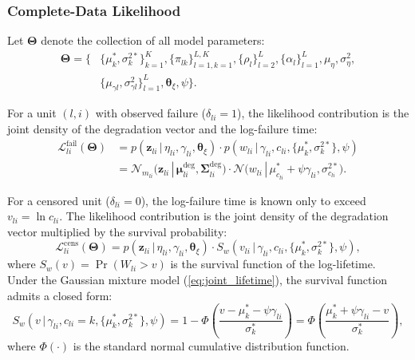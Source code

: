 \documentclass[a4paper,fleqn,longmktitle]{cas-sc}
\newcommand{\given}{\,|\,}
\newcommand{\normal}{\mathcal{N}}
\begin{document}
\subsubsection{Complete-Data Likelihood}

Let $\bm{\Theta}$ denote the collection of all model parameters:
\begin{equation}\label{eq:Theta}
    \begin{aligned}
        \bm{\Theta} = \bigl\{
            &\{\mu_k^*, \sigma_k^{2*}\}_{k=1}^{K},
            \{\pi_{lk}\}_{l=1,k=1}^{L,K},
            \{\rho_l\}_{l=2}^{L}, \{\alpha_l\}_{l=1}^{L},
            \mu_\eta, \sigma_\eta^2, \\
            &\{\mu_{\gamma l}, \sigma_{\gamma l}^2\}_{l=1}^{L},
            \bm{\theta}_\xi, \psi \bigr\}.
    \end{aligned}
\end{equation}

For a unit $(l,i)$ with observed failure ($\delta_{li} = 1$), the likelihood contribution is the joint density of the degradation vector and the log-failure time:
\begin{equation}\label{eq:lik_fail}
    \begin{aligned}
        \mathcal{L}_{li}^{\text{fail}}(\bm{\Theta})
        &= p(\bm{z}_{li} \given \eta_{li}, \gamma_{li}, \bm{\theta}_\xi)
           \cdot p(w_{li} \given \gamma_{li}, c_{li}, \{\mu_k^*, \sigma_k^{2*}\}, \psi) \\[2pt]
        &= \normal_{m_{li}}\!\bigl(\bm{z}_{li} \given \bm{\mu}_{li}^{\text{deg}}, \bm{\Sigma}_{li}^{\text{deg}}\bigr)
           \cdot \normal\!\bigl(w_{li} \given \mu_{c_{li}}^* + \psi\gamma_{li}, \sigma_{c_{li}}^{2*}\bigr).
    \end{aligned}
\end{equation}

For a censored unit ($\delta_{li} = 0$), the log-failure time is known only to exceed $v_{li} = \ln c_{li}$. The likelihood contribution is the joint density of the degradation vector multiplied by the survival probability:
\begin{equation}\label{eq:lik_cens}
    \mathcal{L}_{li}^{\text{cens}}(\bm{\Theta})
    = p(\bm{z}_{li} \given \eta_{li}, \gamma_{li}, \bm{\theta}_\xi)
      \cdot S_{w}(v_{li} \given \gamma_{li}, c_{li}, \{\mu_k^*, \sigma_k^{2*}\}, \psi),
\end{equation}
where $S_{w}(v) = \Pr(W_{li} > v)$ is the survival function of the log-lifetime. Under the Gaussian mixture model (\ref{eq:joint_lifetime}), the survival function admits a closed form:
\begin{equation}\label{eq:survival}
    S_{w}(v \given \gamma_{li}, c_{li} = k, \{\mu_k^*, \sigma_k^{2*}\}, \psi)
    = 1 - \Phi\!\left(\frac{v - \mu_k^* - \psi\gamma_{li}}{\sigma_k^*}\right)
    = \Phi\!\left(\frac{\mu_k^* + \psi\gamma_{li} - v}{\sigma_k^*}\right),
\end{equation}
where $\Phi(\cdot)$ is the standard normal cumulative distribution function.
\end{document}
